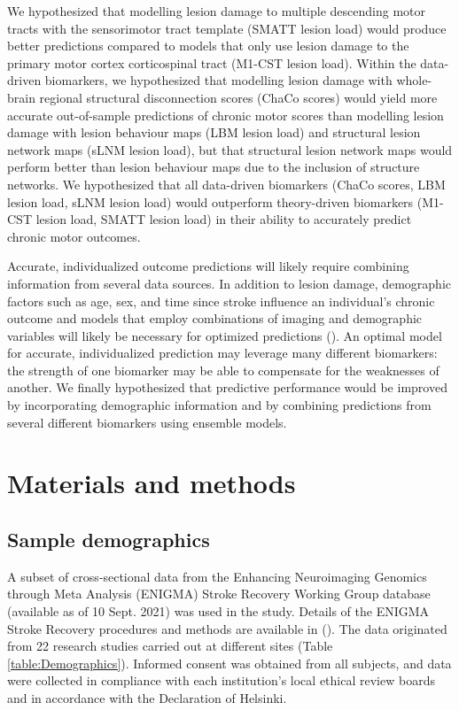 \documentclass[10pt]{article}
\begin{document}
We hypothesized that modelling lesion damage to multiple descending motor tracts with the sensorimotor tract template (SMATT lesion load) would produce better predictions compared to models that only use lesion damage to the primary motor cortex corticospinal tract (M1-CST lesion load). Within the data-driven biomarkers, we hypothesized that modelling lesion damage with whole-brain regional structural disconnection scores (ChaCo scores) would yield more accurate out-of-sample predictions of chronic motor scores than modelling lesion damage with lesion behaviour maps (LBM lesion load) and structural lesion network maps (sLNM lesion load), but that structural lesion network maps would perform better than lesion behaviour maps due to the inclusion of structure networks. We hypothesized that all data-driven biomarkers (ChaCo scores, LBM lesion load, sLNM lesion load) would outperform theory-driven biomarkers (M1-CST lesion load, SMATT lesion load) in their ability to accurately predict chronic motor outcomes. 

 Accurate, individualized outcome predictions will likely require combining information from several data sources. In addition to lesion damage, demographic factors such as age, sex, and time since stroke influence an individual's chronic outcome and models that employ combinations of imaging and demographic variables will likely be necessary for optimized predictions (\cite{Bonkhoff2022-op}). An optimal model for accurate, individualized prediction may leverage many different biomarkers: the strength of one biomarker may be able to compensate for the weaknesses of another. We finally hypothesized that predictive performance would be improved by incorporating demographic information and by combining predictions from several different biomarkers using ensemble models.

\section{Materials and methods}
\subsection{Sample demographics}
A subset of cross‐sectional data from the Enhancing Neuroimaging Genomics through Meta Analysis (ENIGMA) Stroke Recovery Working Group database (available as of 10 Sept. 2021) was used in the study. Details of the ENIGMA Stroke Recovery procedures and methods are available in (\cite{Liew2020-ps}). The data originated from 22 research studies carried out at different sites (Table \ref{table:Demographics}). Informed consent was obtained from all subjects, and data were collected in compliance with each institution’s local ethical review boards and in accordance with the Declaration of Helsinki.
\end{document}
